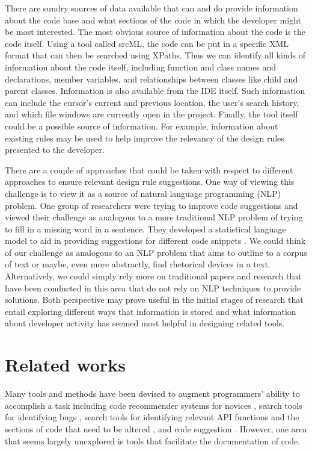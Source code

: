 \documentclass[12pt]{article}
\begin{document}
There are sundry sources of data available that can and do provide information about the code base and what sections of the code in which the developer might be most interested. The most obvious source of information about the code is the code itself. Using a tool called srcML, the code can be put in a specific XML format that can then be searched using XPaths. Thus we can identify all kinds of information about the code itself, including function and class names and declarations, member variables, and relationships between classes like child and parent classes. Information is also available from the IDE itself. Such information can include the cursor's current and previous location, the user's search history, and which file windows are currently open in the project. Finally, the tool itself could be a possible source of information. For example, information about existing rules may be used to help improve the relevancy of the design rules presented to the developer.

There are a couple of approaches that could be taken with respect to different approaches to ensure relevant design rule suggestions. One way of viewing this challenge is to view it as a source of natural language programming (NLP) problem. One group of researchers were trying to improve code suggestions and viewed their challenge as analogous to a more traditional NLP problem of trying to fill in a missing word in a sentence. They developed a statistical language model to aid in providing suggestions for different code snippets \cite{RaychevEtAl2014}. We could think of our challenge as analogous to an NLP problem that aims to outline to a corpus of text or maybe, even more abstractly, find rhetorical devices in a text. Alternatively, we could simply rely more on traditional papers and research that have been conducted in this area that do not rely on NLP techniques to provide solutions. Both perspective may prove useful in the initial stages of research that entail exploring different ways that information is stored and what information about developer activity has seemed most helpful in designing related tools. 



\clearpage


\section{Related works}\label{relatedWorks}

Many tools and methods have been devised to augment programmers' ability to accomplish a task including code recommender systems for novices \cite{HartmannEtAl2010}, search tools for identifying bugs \cite{HovemeyerPugh2004}, search tools for identifying relevant API functions and the sections of code that need to be altered \cite{RongEtAl2016}, and code suggestion \cite{RaychevEtAl2014}. However, one area that seems largely unexplored is tools that facilitate the documentation of code.
\end{document}

